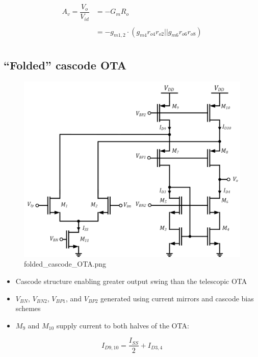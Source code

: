 \documentclass[11pt]{article}
\begin{document}
\begin{align}
A_v  = \dfrac{V_o}{V_{id}} &= -G_m R_o\\
\\
&= \boxed{-g_{m1,2}\cdot( g_{m4}r_{o4}r_{o2}|| g_{m6}r_{o6}r_{o8})}\\
\end{align}

    \hypertarget{folded-cascode-ota}{%
\subsection{``Folded'' cascode OTA}\label{folded-cascode-ota}}

    \begin{figure}
\centering
\includegraphics{folded_cascode_OTA.png}
\caption{folded\_cascode\_OTA.png}
\end{figure}

    \begin{itemize}
\item
  Cascode structure enabling greater output swing than the telescopic
  OTA
\item
  \(V_{BN}\), \(V_{BN2}\), \(V_{BP1}\), and \(V_{BP2}\) generated using
  current mirrors and cascode bias schemes
\item
  \(M_9\) and \(M_{10}\) supply current to both halves of the OTA:
\end{itemize}

\begin{equation}
I_{D9,10} = \dfrac{I_{SS}}{2} + I_{D3,4}
\end{equation}
\end{document}
